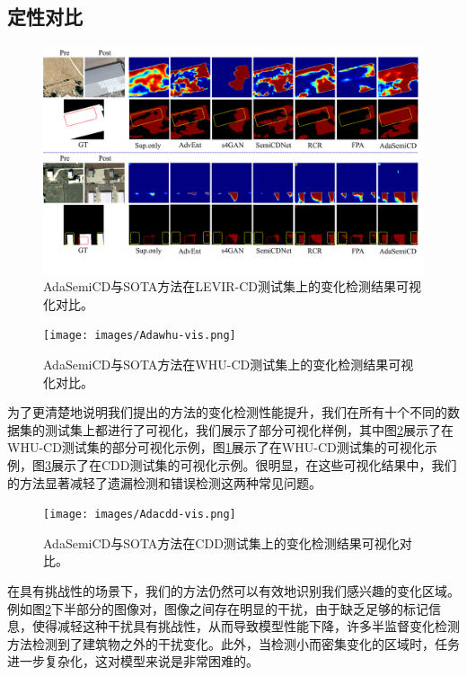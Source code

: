 \documentclass[lang=chs, degree=master, blindreview=false, adobe=false]{yanputhesis}
\begin{document}
\subsection{定性对比}
\begin{figure}[!htbp]
  \centering
  \includegraphics[scale=0.45]{images/Adalevir-vis.png}
  \caption{
    AdaSemiCD与SOTA方法在LEVIR-CD测试集上的变化检测结果可视化对比。
  }
  \label{fig:AdaLevir-vis}
\end{figure}
\begin{figure}[!htbp]
  \centering
  \texttt{[image: images/Adawhu-vis.png]}
  \caption{
    AdaSemiCD与SOTA方法在WHU-CD测试集上的变化检测结果可视化对比。
  }
  \label{fig:AdaWhu-vis}
\end{figure}
为了更清楚地说明我们提出的方法的变化检测性能提升，我们在所有十个不同的数据集的测试集上都进行了可视化，我们展示了部分可视化样例，其中图\ref{fig:AdaWhu-vis}展示了在WHU-CD测试集的部分可视化示例，图\ref{fig:AdaLevir-vis}展示了在WHU-CD测试集的可视化示例，图\ref{fig:AdaCdd-vis}展示了在CDD测试集的可视化示例。很明显，在这些可视化结果中，我们的方法显著减轻了遗漏检测和错误检测这两种常见问题。
\begin{figure}[!htbp]
  \centering
  \texttt{[image: images/Adacdd-vis.png]}
  \caption{
    AdaSemiCD与SOTA方法在CDD测试集上的变化检测结果可视化对比。
  }
  \label{fig:AdaCdd-vis}
  \end{figure}
在具有挑战性的场景下，我们的方法仍然可以有效地识别我们感兴趣的变化区域。例如图\ref{fig:AdaWhu-vis}下半部分的图像对，图像之间存在明显的干扰，由于缺乏足够的标记信息，使得减轻这种干扰具有挑战性，从而导致模型性能下降，许多半监督变化检测方法检测到了建筑物之外的干扰变化。此外，当检测小而密集变化的区域时，任务进一步复杂化，这对模型来说是非常困难的。
\end{document}
